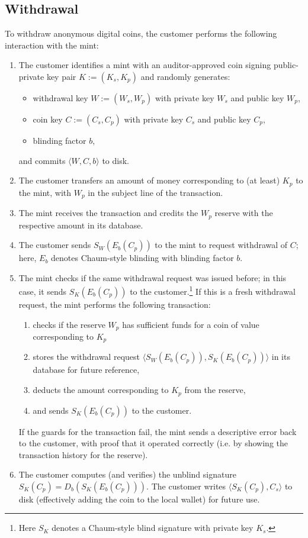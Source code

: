 \documentclass{llncs}
\begin{document}
\subsection{Withdrawal}

To withdraw anonymous digital coins, the customer performs the
following interaction with the mint:

\begin{enumerate}
  \item The customer identifies a mint with an auditor-approved
        coin signing public-private key pair $K := (K_s, K_p)$
        and randomly generates:
        \begin{itemize}
           \item withdrawal key $W := (W_s,W_p)$ with private key $W_s$ and public key $W_p$,
           \item coin key $C := (C_s,C_p)$ with private key $C_s$ and public key $C_p$,
           \item blinding factor $b$,
        \end{itemize}
        and commits $\langle W, C, b \rangle$ to disk.
  \item The customer transfers an amount of money corresponding to (at least) $K_p$ to the mint, with $W_p$ in the subject line of the transaction.
  \item The mint receives the transaction and credits the $W_p$ reserve with the respective amount in its database.
  \item The customer sends $S_W(E_b(C_p))$ to the mint to request withdrawal of $C$; here, $E_b$ denotes Chaum-style blinding with blinding factor $b$.
  \item The mint checks if the same withdrawal request was issued before; in this case, it sends $S_{K}(E_b(C_p))$ to the customer.\footnote{Here $S_K$
        denotes a Chaum-style blind signature with private key $K_s$.}
        If this is a fresh withdrawal request, the mint performs the following transaction:
        \begin{enumerate}
           \item checks if the reserve $W_p$ has sufficient funds for a coin of value corresponding to $K_p$
           \item stores the withdrawal request $\langle S_W(E_b(C_p)), S_K(E_b(C_p)) \rangle$ in its database for future reference,
           \item deducts the amount corresponding to $K_p$ from the reserve,
           \item and sends $S_{K}(E_b(C_p))$ to the customer.
        \end{enumerate}
        If the guards for the transaction fail, the mint sends a descriptive error back to the customer,
        with proof that it operated correctly (i.e. by showing the transaction history for the reserve).
  \item The customer computes (and verifies) the unblind signature $S_K(C_p) = D_b(S_K(E_b(C_p)))$.
        The customer writes $\langle S_K(C_p), C_s \rangle$ to disk (effectively adding the coin to the
        local wallet) for future use.
\end{enumerate}
\end{document}
